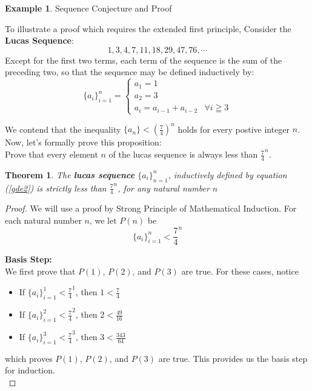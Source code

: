 \documentclass{book}
\newtheorem{theorem}{Theorem}[section]
\theoremstyle{definition}
\newtheorem{example}{Example}[definition]
\theoremstyle{remark}
\begin{document}
\newpage
\begin{example}
Sequence Conjecture and Proof

To illustrate a proof which requires the extended first principle, Consider the \textbf{Lucas Sequence}:
    \begin{equation*}
        1, 3, 4, 7, 11, 18, 29, 47, 76, \cdots
    \end{equation*}
Except for the first two terms, each term of the sequence is the sum of the preceding two, so that the sequence may be defined inductively by:
    \begin{equation}
    \label{gde2}
        \{a_i\}_{i=1}^{n}= 
    \begin{cases}
        a_1 = 1 \\
        a_2 = 3 \\
        a_i = a_{i-1}+a_{i-2} & {\forall i \geqq 3}
    \end{cases}
   \end{equation}

We contend that the inequality $\{a_n\} < (\frac{7}{4})^n$ holds for every postive integer $n$. Now, let's formally prove this proposition: \\ 

Prove that every element $n$ of the lucas sequence is always less than ${\frac{7}{4}}^n$. 
\begin{tcolorbox}
    \begin{theorem}
        The \textbf{lucas sequence} $\{a_i\}_{n=1}^{n}$, inductively defined by equation (\ref{gde2}) is strictly less than $\frac{7}{4}^n$, for any natural number $n$
    \end{theorem}
\end{tcolorbox}

\begin{proof}
        We will use a proof by Strong Principle of Mathematical Induction. For each natural number $n$, we let $P(n)$ be
            \begin{equation*}
                 \{a_i\}_{i=1}^{n}  < \frac{7}{4}^{n}
            \end{equation*}
        
        \textbf{Basis Step:} \\
            We first prove that $P(1)$,  $P(2)$, and $P(3)$ are true. For these cases, notice
                \begin{itemize}
                    \item If $\{a_i\}_{i=1}^{1} < {\frac{7}{4}}^1$, then $1 < \frac{7}{4}$
                    \item If $\{a_i\}_{i=1}^{2} < {\frac{7}{4}}^2$, then $2 < \frac{49}{16}$
                    \item If $\{a_i\}_{i=1}^{3} < {\frac{7}{4}}^3$, then $3 < \frac{343}{64}$
                \end{itemize}
            which proves $P(1)$,  $P(2)$, and $P(3)$ are true. This provides us the basis step for induction. \\ 
        

\end{proof}
\end{example}
\end{document}
